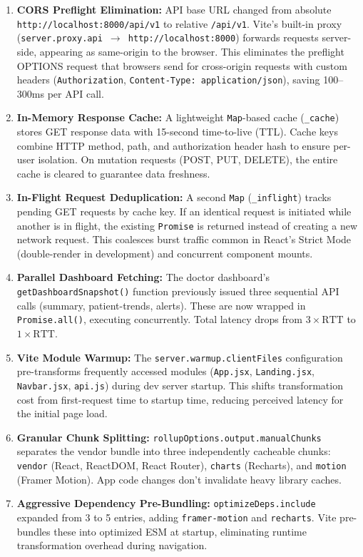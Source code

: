 \documentclass[12pt]{article}
\begin{document}
	\begin{enumerate}
		\item \textbf{CORS Preflight Elimination:} API base URL changed from absolute \texttt{http://localhost:8000/api/v1} to relative \texttt{/api/v1}. Vite's built-in proxy (\texttt{server.proxy.\/api $\rightarrow$ http://localhost:8000}) forwards requests server-side, appearing as same-origin to the browser. This eliminates the preflight OPTIONS request that browsers send for cross-origin requests with custom headers (\texttt{Authorization}, \texttt{Content-Type: application/json}), saving 100--300ms per API call.

		\item \textbf{In-Memory Response Cache:} A lightweight \texttt{Map}-based cache (\texttt{\_cache}) stores GET response data with 15-second time-to-live (TTL). Cache keys combine HTTP method, path, and authorization header hash to ensure per-user isolation. On mutation requests (POST, PUT, DELETE), the entire cache is cleared to guarantee data freshness.

		\item \textbf{In-Flight Request Deduplication:} A second \texttt{Map} (\texttt{\_inflight}) tracks pending GET requests by cache key. If an identical request is initiated while another is in flight, the existing \texttt{Promise} is returned instead of creating a new network request. This coalesces burst traffic common in React's Strict Mode (double-render in development) and concurrent component mounts.

		\item \textbf{Parallel Dashboard Fetching:} The doctor dashboard's \texttt{getDashboardSnapshot()} function previously issued three sequential API calls (summary, patient-trends, alerts). These are now wrapped in \texttt{Promise.all()}, executing concurrently. Total latency drops from $3 \times \text{RTT}$ to $1 \times \text{RTT}$.

		\item \textbf{Vite Module Warmup:} The \texttt{server.warmup.clientFiles} configuration pre-transforms frequently accessed modules (\texttt{App.jsx}, \texttt{Landing.jsx}, \texttt{Navbar.jsx}, \texttt{api.js}) during dev server startup. This shifts transformation cost from first-request time to startup time, reducing perceived latency for the initial page load.

		\item \textbf{Granular Chunk Splitting:} \texttt{rollupOptions.output.manualChunks} separates the vendor bundle into three independently cacheable chunks: \texttt{vendor} (React, ReactDOM, React Router), \texttt{charts} (Recharts), and \texttt{motion} (Framer Motion). App code changes don't invalidate heavy library caches.

		\item \textbf{Aggressive Dependency Pre-Bundling:} \texttt{optimizeDeps.include} expanded from 3 to 5 entries, adding \texttt{framer-motion} and \texttt{recharts}. Vite pre-bundles these into optimized ESM at startup, eliminating runtime transformation overhead during navigation.
	\end{enumerate}
\end{document}
